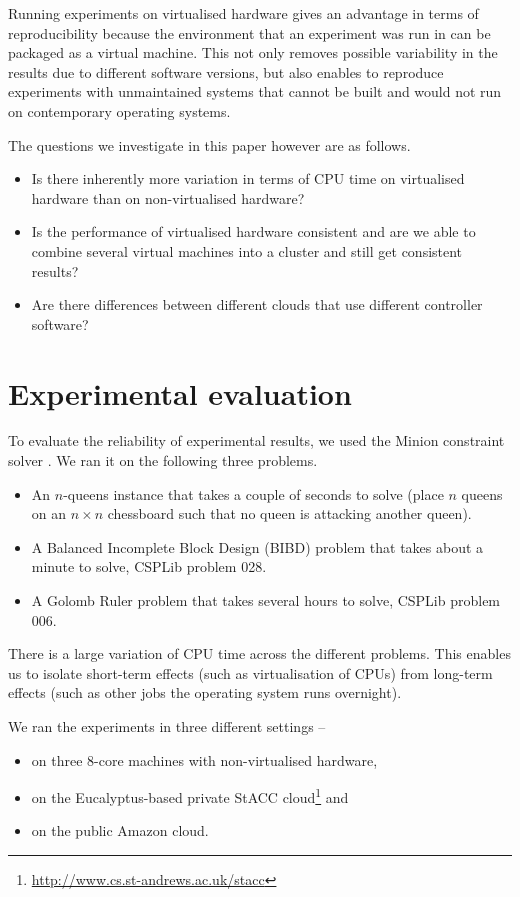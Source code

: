 \documentclass{llncs}
\begin{document}
Running experiments on virtualised hardware gives an advantage in terms of
reproducibility because the environment that an experiment was run in can be
packaged as a virtual machine. This not only removes possible variability in the
results due to different software versions, but also enables to reproduce
experiments with unmaintained systems that cannot be built and would not run on
contemporary operating systems.

The questions we investigate in this paper however are as follows.
\begin{itemize}
\item Is there inherently more variation in terms of CPU time on virtualised
    hardware than on non-virtualised hardware?
\item Is the performance of virtualised hardware consistent and are we able to
    combine several virtual machines into a cluster and still get consistent
    results?
\item Are there differences between different clouds that use different
    controller software?
\end{itemize}




\section{Experimental evaluation}

To evaluate the reliability of experimental results, we used the Minion
constraint solver \citep{minion}. We ran it on the following three problems.
\begin{itemize}
\item An $n$-queens instance that takes a couple of seconds to solve (place $n$
    queens on an $n\times n$ chessboard such that no queen is attacking another
    queen).
\item A Balanced Incomplete Block Design (BIBD) problem that takes about a
    minute to solve, CSPLib \citep{csplib} problem 028.
\item A Golomb Ruler problem that takes several hours to solve, CSPLib problem
    006.
\end{itemize}

There is a large variation of CPU time across the different problems. This
enables us to isolate short-term effects (such as virtualisation of CPUs) from
long-term effects (such as other jobs the operating system runs overnight).

We ran the experiments in three different settings --
\begin{itemize}
\item on three 8-core machines with non-virtualised hardware,
\item on the Eucalyptus-based private StACC
    cloud\footnote{\url{http://www.cs.st-andrews.ac.uk/stacc}} and
\item on the public Amazon cloud.
\end{itemize}
\end{document}
